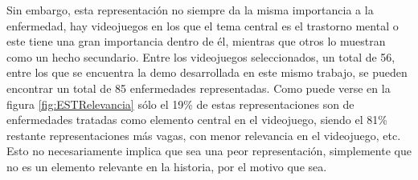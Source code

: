 \documentclass[12pt, a4paper,twoside,titlepage]{book}
\begin{document}
Sin embargo, esta representación no siempre da la misma importancia a la enfermedad, hay videojuegos en los que el tema central es el trastorno mental o este tiene una gran importancia dentro de él, mientras que otros lo muestran como un hecho secundario. Entre los videojuegos seleccionados, un total de 56, entre los que se encuentra la demo desarrollada en este mismo trabajo, se pueden encontrar un total de 85 enfermedades representadas. Como puede verse en la figura \ref{fig:ESTRelevancia} sólo el 19\% de estas representaciones son de enfermedades tratadas como elemento central en el videojuego, siendo el 81\% restante representaciones más vagas, con menor relevancia en el videojuego, etc. Esto no necesariamente implica que sea una peor representación, simplemente que no es un elemento relevante en la historia, por el motivo que sea. 
\end{document}
